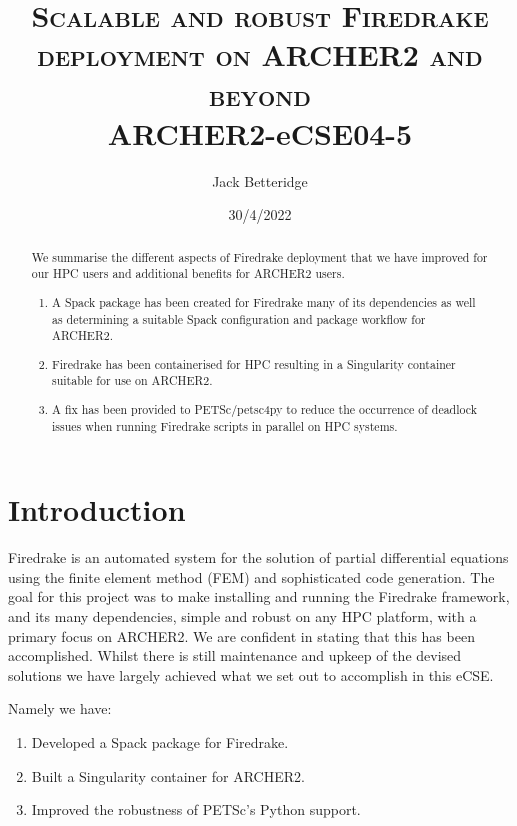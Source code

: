 \documentclass[a4paper,11pt]{article}
\title{\textsc{Scalable and robust Firedrake deployment on ARCHER2 and beyond}\\
\Large ARCHER2-eCSE04-5}
\author{Jack Betteridge}
\date{30/4/2022}
\begin{document}
\maketitle

\begin{abstract}
	We summarise the different aspects of Firedrake deployment that we have improved for our HPC users and additional benefits for ARCHER2 users.
	\begin{enumerate}
	\item A Spack package has been created for Firedrake many of its dependencies as well as determining a suitable Spack configuration and package workflow for ARCHER2.
	\item Firedrake has been containerised for HPC resulting in a Singularity container suitable for use on ARCHER2.
	\item A fix has been provided to PETSc/petsc4py to reduce the occurrence of deadlock issues when running Firedrake scripts in parallel on HPC systems.
\end{enumerate}
\end{abstract}

\section{Introduction}
\label{sec:intro}
Firedrake is an automated system for the solution of partial differential equations using the finite element method (FEM) and sophisticated code generation.
The goal for this project was to make installing and running the Firedrake framework\cite{firedrakeweb,firedrakepaper}, and its many dependencies, simple and robust on any HPC platform, with a primary focus on ARCHER2.
We are confident in stating that this has been accomplished.
Whilst there is still maintenance and upkeep of the devised solutions we have largely achieved what we set out to accomplish in this eCSE.

\noindent Namely we have:
\begin{enumerate}[topsep=2pt, partopsep=0pt, itemsep=1pt, parsep=1pt]
    \item Developed a Spack package for Firedrake.
	\item Built a Singularity container for ARCHER2.
	\item Improved the robustness of PETSc's Python support.
\end{enumerate} 
\end{document}
